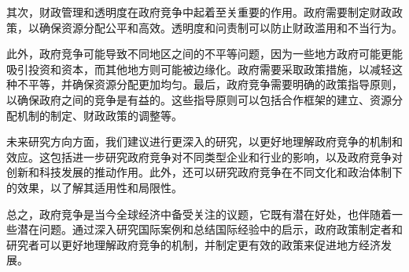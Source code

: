 \documentclass[a4paper,12pt]{ctexart}
\begin{document}
其次，财政管理和透明度在政府竞争中起着至关重要的作用。政府需要制定财政政策，以确保资源分配公平和高效。透明度和问责制可以防止财政滥用和不当行为。

此外，政府竞争可能导致不同地区之间的不平等问题，因为一些地方政府可能更能吸引投资和资本，而其他地方则可能被边缘化。政府需要采取政策措施，以减轻这种不平等，并确保资源分配更加均匀。最后，政府竞争需要明确的政策指导原则，以确保政府之间的竞争是有益的。这些指导原则可以包括合作框架的建立、资源分配机制的制定、财政政策的调整等。

未来研究方向方面，我们建议进行更深入的研究，以更好地理解政府竞争的机制和效应。这包括进一步研究政府竞争对不同类型企业和行业的影响，以及政府竞争对创新和科技发展的推动作用。此外，还可以研究政府竞争在不同文化和政治体制下的效果，以了解其适用性和局限性。

总之，政府竞争是当今全球经济中备受关注的议题，它既有潜在好处，也伴随着一些潜在问题。通过深入研究国际案例和总结国际经验中的启示，政府政策制定者和研究者可以更好地理解政府竞争的机制，并制定更有效的政策来促进地方经济发展。
\nocite{*}
\printbibliography
\end{document}
